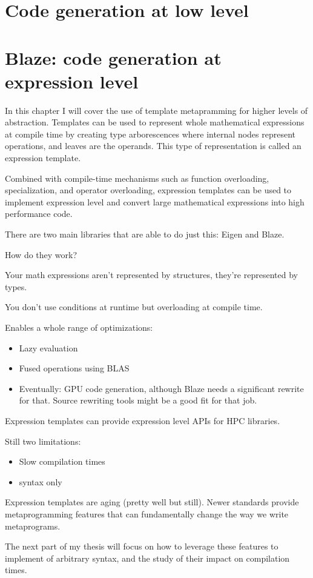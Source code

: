 \documentclass[../../main.tex]{subfiles}
\begin{document}
\chapter{Code generation at low level}



\chapter{Blaze: code generation at expression level}

In this chapter I will cover the use of template metapramming for higher levels
of abstraction. Templates can be used to represent whole mathematical
expressions at compile time by creating type arborescences where internal
nodes represent operations, and leaves are the operands. This type of
representation is called an expression template\cite{veldhuizen:1995}.

Combined with compile-time mechanisms such as function overloading,
specialization, and operator overloading, expression templates can be used to
implement expression level \dsels and convert large mathematical expressions
into high performance code.

There are two main libraries that are able to do just this: Eigen\cite{eigen}
and Blaze\cite{blazelib}.



How do they work?

Your math expressions aren't represented by structures,
they're represented by types.

You don't use conditions at runtime but overloading at compile time.

Enables a whole range of optimizations:

\begin{itemize}
\item Lazy evaluation
\item Fused operations using BLAS
\item Eventually: GPU code generation, although Blaze needs a significant
      rewrite for that. Source rewriting tools might be a good fit for that job.
\end{itemize}

Expression templates can provide expression level APIs for HPC libraries.

Still two limitations:

\begin{itemize}
\item Slow compilation times
\item \cpp syntax only
\end{itemize}

Expression templates are aging (pretty well but still).
Newer \cpp standards provide metaprogramming features that can fundamentally
change the way we write metaprograms.

The next part of my thesis will focus on how to leverage these features to
implement \dsel of arbitrary syntax, and the study of their impact on
compilation times.
\end{document}
